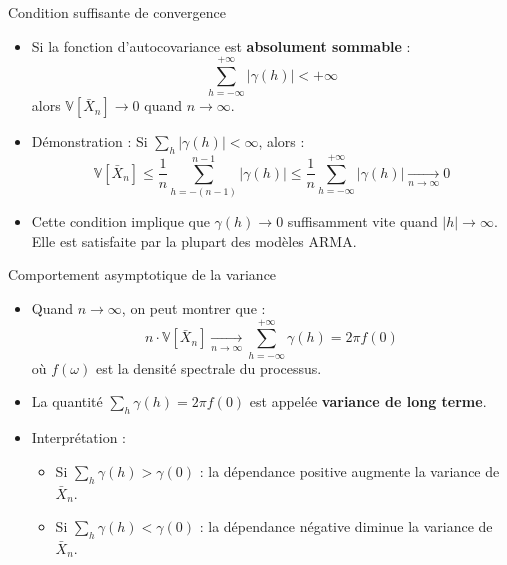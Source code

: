 \documentclass[11pt,aspectratio=169]{beamer}
\newcommand{\Var}{\mathbb{V}}
\begin{document}
\begin{frame}{Condition suffisante de convergence}

\begin{itemize}

\item Si la fonction d'autocovariance est \textbf{absolument sommable} :
  \[
  \sum_{h=-\infty}^{+\infty} |\gamma(h)| < +\infty
  \]
  alors $\Var[\bar{X}_n] \to 0$ quand $n \to \infty$.\newline

\item Démonstration : Si $\sum_{h} |\gamma(h)| < \infty$, alors :
  \[
  \Var[\bar{X}_n] \leq \frac{1}{n} \sum_{h=-(n-1)}^{n-1} |\gamma(h)| \leq \frac{1}{n} \sum_{h=-\infty}^{+\infty} |\gamma(h)| \xrightarrow[n \to \infty]{} 0
  \]\newline

\item Cette condition implique que $\gamma(h) \to 0$ suffisamment vite quand $|h| \to \infty$. Elle est satisfaite par la plupart des modèles ARMA.

\end{itemize}

\end{frame}

\begin{frame}{Comportement asymptotique de la variance}

\begin{itemize}

\item Quand $n \to \infty$, on peut montrer que :
  \[
  n \cdot \Var[\bar{X}_n] \xrightarrow[n \to \infty]{} \sum_{h=-\infty}^{+\infty} \gamma(h) = 2\pi f(0)
  \]
  où $f(\omega)$ est la densité spectrale du processus.\newline

\item La quantité $\sum_{h} \gamma(h) = 2\pi f(0)$ est appelée \textbf{variance de long terme}.\newline

\item Interprétation :
  \begin{itemize}
    \item Si $\sum_{h} \gamma(h) > \gamma(0)$ : la dépendance positive augmente la variance de $\bar{X}_n$.\newline
    \item Si $\sum_{h} \gamma(h) < \gamma(0)$ : la dépendance négative diminue la variance de $\bar{X}_n$.
  \end{itemize}

\end{itemize}

\end{frame}
\end{document}
